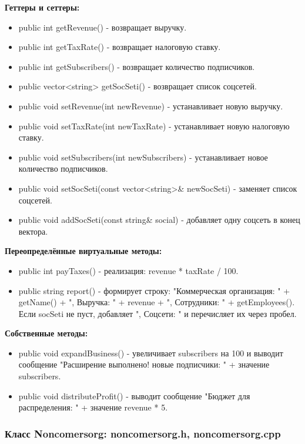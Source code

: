 \documentclass[oneside,a4paper,14pt]{extarticle}
\begin{document}
    \newpage

    \textbf{Геттеры и сеттеры:}
    \begin{itemize}
        \item public int getRevenue() - возвращает выручку.
        \item public int getTaxRate() - возвращает налоговую ставку.
        \item public int getSubscribers() - возвращает количество подписчиков.
        \item public vector<string> getSocSeti() - возвращает список соцсетей.
        \item public void setRevenue(int newRevenue) - устанавливает новую выручку.
        \item public void setTaxRate(int newTaxRate) - устанавливает новую налоговую ставку.
        \item public void setSubscribers(int newSubscribers) - устанавливает новое количество подписчиков.
        \item public void setSocSeti(const vector<string>\& newSocSeti) - заменяет список соцсетей.
        \item public void addSocSeti(const string\& social) - добавляет одну соцсеть в конец вектора.
    \end{itemize}

    \textbf{Переопределённые виртуальные методы:}
    \begin{itemize}
        \item public int payTaxes() - реализация: revenue * taxRate / 100.
        \item public string report() - формирует строку: "Коммерческая организация: " + getName() + ", Выручка: " + revenue + ", Сотрудники: " + getEmployees(). Если socSeti не пуст, добавляет ", Соцсети: " и перечисляет их через пробел.
    \end{itemize}

    \textbf{Собственные методы:}
    \begin{itemize}
        \item public void expandBusiness() - увеличивает subscribers на 100 и выводит сообщение "Расширение выполнено! новые подписчики: " + значение subscribers.
        \item public void distributeProfit() - выводит сообщение "Бюджет для распределения: " + значение revenue * 5.
    \end{itemize}

    \subsubsection*{Класс Noncomersorg: noncomersorg.h, noncomersorg.cpp}
\end{document}
